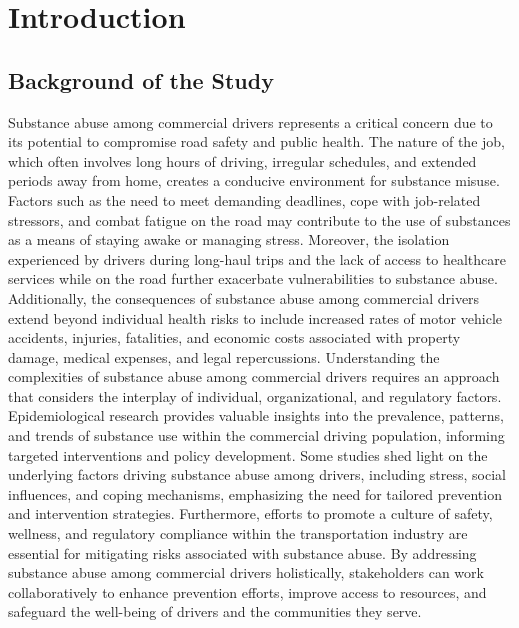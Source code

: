 \documentclass[12pt]{report}
\begin{document}
	\newpage
	
	

	\chapter{Introduction }
	\section{Background of the Study}

	

	Substance abuse among commercial drivers represents a critical concern due to its potential to compromise road safety and public health. The nature of the job, which often involves long hours of driving, irregular schedules, and extended periods away from home, creates a conducive environment for substance misuse. Factors such as the need to meet demanding deadlines, cope with job-related stressors, and combat fatigue on the road may contribute to the use of substances as a means of staying awake or managing stress. Moreover, the isolation experienced by drivers during long-haul trips and the lack of access to healthcare services while on the road further exacerbate vulnerabilities to substance abuse. Additionally, the consequences of substance abuse among commercial drivers extend beyond individual health risks to include increased rates of motor vehicle accidents, injuries, fatalities, and economic costs associated with property damage, medical expenses, and legal repercussions. 
	Understanding the complexities of substance abuse among commercial drivers requires an approach that considers the interplay of individual, organizational, and regulatory factors. Epidemiological research provides valuable insights into the prevalence, patterns, and trends of substance use within the commercial driving population, informing targeted interventions and policy development. Some studies shed light on the underlying factors driving substance abuse among drivers, including stress, social influences, and coping mechanisms, emphasizing the need for tailored prevention and intervention strategies. Furthermore, efforts to promote a culture of safety, wellness, and regulatory compliance within the transportation industry are essential for mitigating risks associated with substance abuse. By addressing substance abuse among commercial drivers holistically, stakeholders can work collaboratively to enhance prevention efforts, improve access to resources, and safeguard the well-being of drivers and the communities they serve. 
	
\end{document}
